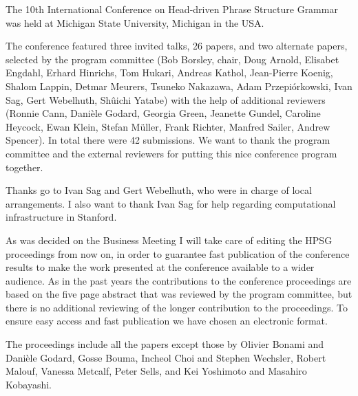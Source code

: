 The 10th International Conference on Head-driven Phrase Structure Grammar was held at
Michigan State University, Michigan in the USA. 

The conference featured three invited talks, 26 papers, and two alternate papers,
selected by the program committee 
(Bob Borsley, chair,
Doug Arnold,
Elisabet Engdahl,
Erhard Hinrichs,
Tom Hukari,
Andreas Kathol,
Jean-Pierre Koenig,
Shalom Lappin,
Detmar Meurers,
Tsuneko Nakazawa,
Adam Przepiórkowski,
Ivan Sag,
Gert Webelhuth,
Shûichi Yatabe) with the help of additional reviewers (Ronnie Cann,
Danièle Godard, 
Georgia Green,
Jeanette Gundel,
Caroline Heycock,
Ewan Klein,
Stefan Müller,
Frank Richter,
Manfred Sailer, 
Andrew Spencer).
In total there were 42 submissions.
We want to thank the program committee and the external reviewers
for putting this nice conference program together.

Thanks go to Ivan Sag and Gert Webelhuth, who were in charge of local arrangements.
I also want to thank Ivan Sag for help regarding computational infrastructure in Stanford.

As was decided on the Business Meeting I will take care of editing the HPSG proceedings from now on,
in order to guarantee fast publication of the conference results
to make the work presented at the conference available to a wider audience. 
As in the past years the contributions to the conference proceedings are based on the five page abstract
that was reviewed by the program committee, but there is no additional reviewing of the
longer contribution to the proceedings.
To ensure easy access and fast publication we have chosen an electronic format.

The proceedings include all the papers except those by 
Olivier Bonami and Danièle Godard,
Gosse Bouma,
Incheol Choi and Stephen Wechsler,
Robert Malouf,
Vanessa Metcalf,
Peter Sells,
and Kei Yoshimoto and Masahiro Kobayashi.
